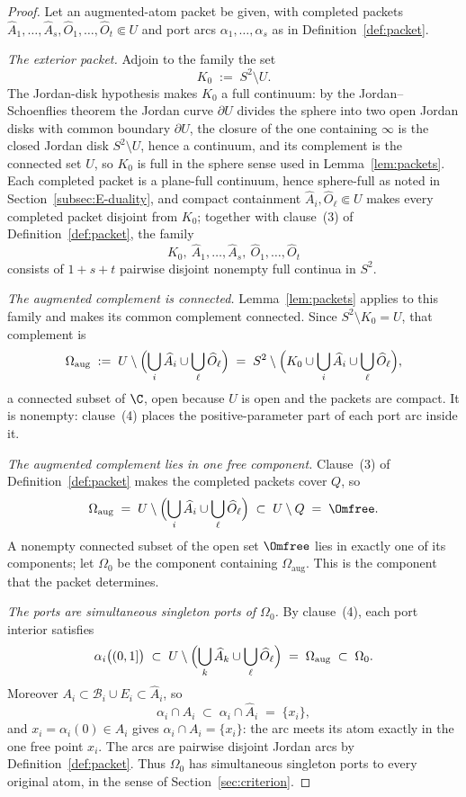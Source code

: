 \begin{proof}
Let an augmented-atom packet be given, with completed packets
$\widehat A_1,\dots,\widehat A_s,\widehat O_1,\dots,\widehat O_t\Subset U$ and port
arcs $\alpha_1,\dots,\alpha_s$ as in Definition~\ref{def:packet}.

\emph{The exterior packet.}
Adjoin to the family the set
\[
K_0\;:=\;S^2\setminus U .
\]
The Jordan-disk hypothesis makes $K_0$ a full continuum: by the Jordan--Schoenflies
theorem the Jordan curve $\partial U$ divides the sphere into two open Jordan disks
with common boundary $\partial U$, the closure of the one containing $\infty$ is the
closed Jordan disk $S^2\setminus U$, hence a continuum, and its complement is the
connected set $U$, so $K_0$ is full in the sphere sense used in
Lemma~\ref{lem:packets}. Each completed packet is a plane-full continuum, hence
sphere-full as noted in Section~\ref{subsec:E-duality}, and compact containment
$\widehat A_i,\widehat O_\ell\Subset U$ makes every completed packet disjoint from
$K_0$; together with clause~(3) of Definition~\ref{def:packet}, the family
\[
K_0,\ \widehat A_1,\dots,\widehat A_s,\ \widehat O_1,\dots,\widehat O_t
\]
consists of $1+s+t$ pairwise disjoint nonempty full continua in $S^2$.

\emph{The augmented complement is connected.}
Lemma~\ref{lem:packets} applies to this family and makes its common complement
connected. Since $S^2\setminus K_0=U$, that complement is
\begin{equation}\label{eq:E-omega-aug}
\Omega_{\mathrm{aug}}\;:=\;
U\setminus\Bigl(\bigcup_{i}\widehat A_i\cup\bigcup_{\ell}\widehat O_\ell\Bigr)
\;=\;S^2\setminus\Bigl(K_0\cup\bigcup_i\widehat A_i\cup
\bigcup_\ell\widehat O_\ell\Bigr),
\end{equation}
a connected subset of $\C$, open because $U$ is open and the packets are compact. It
is nonempty: clause~(4) places the positive-parameter part of each port arc inside
it.

\emph{The augmented complement lies in one free component.}
Clause~(3) of Definition~\ref{def:packet} makes the completed packets cover $Q$, so
\[
\Omega_{\mathrm{aug}}
\;=\;U\setminus\Bigl(\bigcup_i\widehat A_i\cup\bigcup_\ell\widehat O_\ell\Bigr)
\;\subset\;U\setminus Q\;=\;\Omfree .
\]
A nonempty connected subset of the open set $\Omfree$ lies in exactly one of its
components; let $\Omega_0$ be the component containing $\Omega_{\mathrm{aug}}$. This
is the component that the packet determines.

\emph{The ports are simultaneous singleton ports of $\Omega_0$.}
By clause~(4), each port interior satisfies
\[
\alpha_i\bigl((0,1]\bigr)\;\subset\;
U\setminus\Bigl(\bigcup_k\widehat A_k\cup\bigcup_\ell\widehat O_\ell\Bigr)
\;=\;\Omega_{\mathrm{aug}}\;\subset\;\Omega_0 .
\]
Moreover $A_i\subset\mathcal B_i\cup E_i\subset\widehat A_i$, so
\[
\alpha_i\cap A_i\;\subset\;\alpha_i\cap\widehat A_i\;=\;\{x_i\},
\]
and $x_i=\alpha_i(0)\in A_i$ gives $\alpha_i\cap A_i=\{x_i\}$: the arc meets its atom
exactly in the one free point $x_i$. The arcs are pairwise disjoint Jordan arcs by
Definition~\ref{def:packet}. Thus $\Omega_0$ has simultaneous singleton ports to
every original atom, in the sense of Section~\ref{sec:criterion}.


\end{proof}
